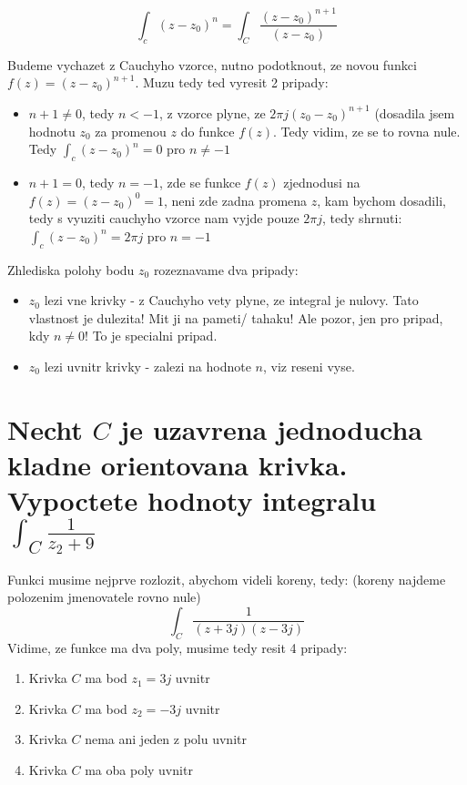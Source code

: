 $$\int_c (z-z_0)^n = \int_C \frac{(z-z_0)^{n+1}}{(z-z_0)}$$

Budeme vychazet z Cauchyho vzorce, nutno podotknout, ze novou funkci $f(z) = (z-z_0)^{n+1}$. Muzu tedy ted vyresit 2 pripady:
\begin{itemize}
\item $n+1 \neq 0$, tedy $n < -1$, z vzorce plyne, ze $2\pi j (z_0 - z_0)^{n+1}$ (dosadila jsem hodnotu $z_0$ za promenou $z$ do funkce $f(z)$. Tedy vidim, ze se to rovna nule. Tedy  $\int_c (z-z_0)^n = 0$ pro $n \neq -1$
\item $n+1 = 0$, tedy $n = -1$, zde se funkce $f(z)$ zjednodusi na $f(z)=(z-z_0)^0 = 1$, neni zde zadna promena $z$, kam bychom dosadili, tedy s vyuziti cauchyho vzorce nam vyjde pouze $2\pi j$, tedy shrnuti:
 $\int_c (z-z_0)^n = 2\pi j$ pro $n= -1$
\end{itemize}

Zhlediska polohy bodu $z_0$ rozeznavame dva pripady:
\begin{itemize}
\item $z_0$ lezi vne krivky - z Cauchyho vety plyne, ze integral je nulovy. Tato vlastnost je dulezita! Mit ji na pameti/ tahaku! Ale pozor, jen pro pripad, kdy $n \neq 0$! To je specialni pripad.
\item $z_0$ lezi uvnitr krivky - zalezi na hodnote $n$, viz reseni vyse. 
\end{itemize}

\newpage

\section{Necht $C$ je uzavrena jednoducha kladne orientovana krivka. Vypoctete hodnoty integralu $\int_C \frac{1}{z_2+9}$}

Funkci musime nejprve rozlozit, abychom videli koreny, tedy: (koreny najdeme polozenim jmenovatele rovno nule)
$$\int_C \frac{1}{(z+3j)(z-3j)}$$
Vidime, ze funkce ma dva poly, musime tedy resit 4 pripady:
\begin{enumerate}
\item Krivka $C$ ma bod $z_1=3j$ uvnitr
\item Krivka $C$ ma bod $z_2=-3j$ uvnitr
\item Krivka $C$ nema ani jeden z polu uvnitr
\item Krivka $C$ ma oba poly uvnitr
\end{enumerate}